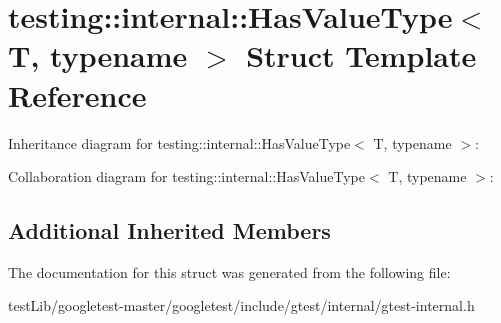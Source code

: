 \hypertarget{structtesting_1_1internal_1_1HasValueType}{}\section{testing\+:\+:internal\+:\+:Has\+Value\+Type$<$ T, typename $>$ Struct Template Reference}
\label{structtesting_1_1internal_1_1HasValueType}


Inheritance diagram for testing\+:\+:internal\+:\+:Has\+Value\+Type$<$ T, typename $>$\+:


Collaboration diagram for testing\+:\+:internal\+:\+:Has\+Value\+Type$<$ T, typename $>$\+:
\subsection*{Additional Inherited Members}


The documentation for this struct was generated from the following file\+:\begin{DoxyCompactItemize}
\item 
test\+Lib/googletest-\/master/googletest/include/gtest/internal/gtest-\/internal.\+h\end{DoxyCompactItemize}
